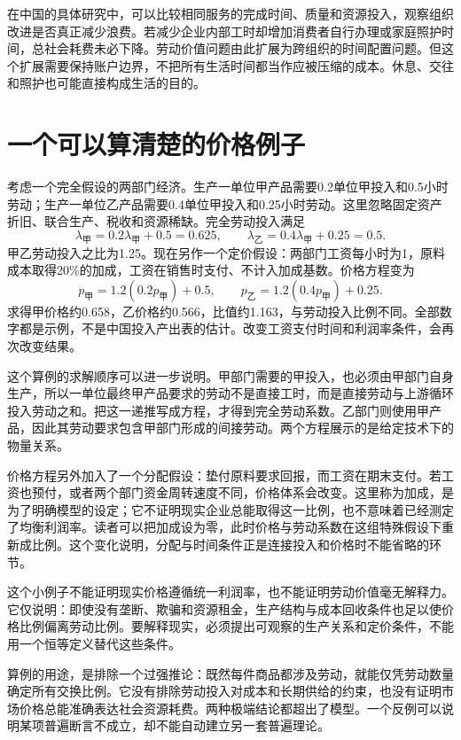 \documentclass[UTF8,fontset=fandol,zihao=-4,oneside,openany]{ctexbook}
\begin{document}
在中国的具体研究中，可以比较相同服务的完成时间、质量和资源投入，观察组织改进是否真正减少浪费。若减少企业内部工时却增加消费者自行办理或家庭照护时间，总社会耗费未必下降。劳动价值问题由此扩展为跨组织的时间配置问题。但这个扩展需要保持账户边界，不把所有生活时间都当作应被压缩的成本。休息、交往和照护也可能直接构成生活的目的。

\section{一个可以算清楚的价格例子}
考虑一个完全假设的两部门经济。生产一单位甲产品需要0.2单位甲投入和0.5小时劳动；生产一单位乙产品需要0.4单位甲投入和0.25小时劳动。这里忽略固定资产折旧、联合生产、税收和资源稀缺。完全劳动投入满足
\[
\lambda_{\text{甲}}=0.2\lambda_{\text{甲}}+0.5=0.625,
\qquad
\lambda_{\text{乙}}=0.4\lambda_{\text{甲}}+0.25=0.5.
\]
甲乙劳动投入之比为1.25。现在另作一个定价假设：两部门工资每小时为1，原料成本取得20\%的加成，工资在销售时支付、不计入加成基数。价格方程变为
\[
p_{\text{甲}}=1.2(0.2p_{\text{甲}})+0.5,
\qquad
p_{\text{乙}}=1.2(0.4p_{\text{甲}})+0.25.
\]
求得甲价格约0.658，乙价格约0.566，比值约1.163，与劳动投入比例不同。全部数字都是示例，不是中国投入产出表的估计。改变工资支付时间和利润率条件，会再次改变结果。

\label{arg:P044}
这个算例的求解顺序可以进一步说明。甲部门需要的甲投入，也必须由甲部门自身生产，所以一单位最终甲产品要求的劳动不是直接工时，而是直接劳动与上游循环投入劳动之和。把这一递推写成方程，才得到完全劳动系数。乙部门则使用甲产品，因此其劳动要求包含甲部门形成的间接劳动。两个方程展示的是给定技术下的物量关系。

价格方程另外加入了一个分配假设：垫付原料要求回报，而工资在期末支付。若工资也预付，或者两个部门资金周转速度不同，价格体系会改变。这里称为加成，是为了明确模型的设定；它不证明现实企业总能取得这一比例，也不意味着已经测定了均衡利润率。读者可以把加成设为零，此时价格与劳动系数在这组特殊假设下重新成比例。这个变化说明，分配与时间条件正是连接投入和价格时不能省略的环节。

这个小例子不能证明现实价格遵循统一利润率，也不能证明劳动价值毫无解释力。它仅说明：即使没有垄断、欺骗和资源租金，生产结构与成本回收条件也足以使价格比例偏离劳动比例。要解释现实，必须提出可观察的生产关系和定价条件，不能用一个恒等定义替代这些条件。

\label{arg:P045}
算例的用途，是排除一个过强推论：既然每件商品都涉及劳动，就能仅凭劳动数量确定所有交换比例。它没有排除劳动投入对成本和长期供给的约束，也没有证明市场价格总能准确表达社会资源耗费。两种极端结论都超出了模型。一个反例可以说明某项普遍断言不成立，却不能自动建立另一套普遍理论。
\end{document}

